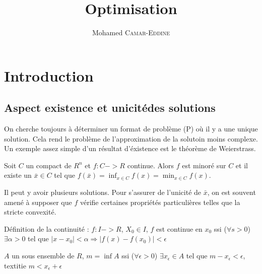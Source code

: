 \providecommand{\VarRectoVerso}{oneside}


%

\title{Optimisation}
\author{Mohamed \textsc{Camar-Eddine}}




\maketitle

\tableofcontents

\section{Introduction}


	\subsection{Aspect \og existence et unicité\fg des solutions}
	
	On cherche toujours à déterminer un format de problème (P) où il y a une unique solution. Cela rend le problème de l'approximation de la solutoin moins complexe. Un exemple assez simple d'un résultat d'éxistence est le théorème de Weierstrass.
	
	Soit $C$ un compact de $R^n$ et $f: C->R$ continue. Alors $f$ est minoré sur $C$ et il existe un $\bar{x} \in C$ tel que $f(\bar{x}) = \inf_{x \in C} f(x) = \min_{x \in C} f(x)$.
	
	Il peut y avoir plusieurs solutions. Pour s'assurer de l'unicité de $\bar{x}$, on est souvent amené à supposer que $f$ vérifie certaines propriétés particulières telles que la stricte convexité.
	
	\begin{definition}
	Définition de la continuité :
	$f:I->R$, $X_0 \in I$, $f$ est continue en $x_0$ ssi ($ \forall s>0$) $\exists \alpha >0$ tel que $|x-x_0| < \alpha \Rightarrow |f(x)-f(x_0)| < \epsilon$
	\end{definition}
	
	$A$ un sous ensemble de $R$, $m = \inf A$ ssi ($\forall \epsilon>0$) $\exists x_\epsilon \in A$ tel que $m - x_\epsilon < \epsilon$, textit{ie} $m < x_\epsilon + \epsilon$
	
